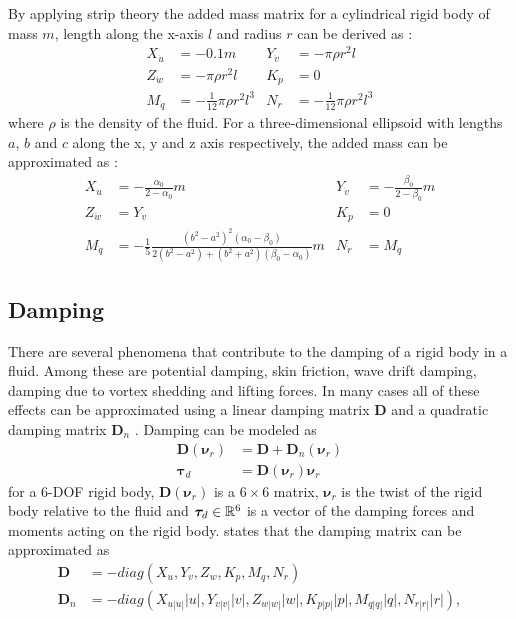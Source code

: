 By applying strip theory the added mass matrix for a cylindrical rigid body of
mass $m$, length along the x-axis $l$ and radius $r$ can be derived as \cite{fossen1994}:
\begin{align}
 X_{\dot{u}} &= -0.1 m &
 Y_{\dot{v}} &= -\pi \rho r^2 l \nonumber \\
 Z_{\dot{w}} &= -\pi \rho r^2 l &
 K_{\dot{p}} &= 0 \\
 M_{\dot{q}} &= -\frac{1}{12} \pi \rho r^2 l^3 &
 N_{\dot{r}} &= -\frac{1}{12} \pi \rho r^2 l^3 \nonumber
\end{align}
where $\rho$ is the density of the fluid. For a three-dimensional ellipsoid with
lengths $a$, $b$ and $c$ along the x, y and z axis respectively, the added mass
can be approximated as \cite{fossen2021}:
\begin{align}
 X_{\dot{u}} &= -\frac{\alpha_0}{2-\alpha_0}m &
 Y_{\dot{v}} &= -\frac{\beta_0}{2-\beta_0}m \nonumber \\
 Z_{\dot{w}} &= Y_{\dot{v}}&
 K_{\dot{p}} &= 0 \label{eq:ellipsoid_added_mass} \\
 M_{\dot{q}} &= -\frac{1}{5}\frac{(b^2-a^2)^2(\alpha_0-\beta_0)}{2(b^2-a^2) + (b^2+a^2)(\beta_0-\alpha_0)}m&
 N_{\dot{r}} &= M_{\dot{q}} \nonumber
\end{align}

\subsection{Damping}

There are several phenomena that contribute to the damping of a rigid body in
a fluid. Among these are potential damping, skin friction, wave drift damping,
damping due to vortex shedding and lifting forces. In many cases
all of these effects can be approximated using a linear damping matrix $\bm{D}$ and
a quadratic damping matrix $\bm{D}_n$ \cite{fossen2021}. Damping can be modeled
as
\begin{align}
    \bm{D}(\bm{\nu}_r) &= \bm{D} + \bm{D}_n(\bm{\nu}_r) \\
    \bm{\tau}_d &= \bm{D}(\bm{\nu}_r)\bm{\nu}_r
\end{align}
for a 6-DOF rigid body, $\bm{D}(\bm{\nu}_r)$ is a $6\times 6$ matrix, $\bm{\nu}_r$
is the twist of the rigid body relative to the fluid and $\bm{\tau}_d \in \mathbb{R}^6$
is a vector of the damping forces and moments acting on the rigid body. \cite{antonelli2018}
states that the damping matrix can be approximated as
\begin{subequations}
\begin{align}
    \bm{D} &= -diag(X_u, Y_v, Z_w, K_p, M_q, N_r) \\
    \bm{D}_n &= -diag(X_{u|u|}|u|, Y_{v|v|}|v|, Z_{w|w|}|w|, K_{p|p|}|p|, M_{q|q|}|q|, N_{r|r|}|r|),
\end{align}
\end{subequations}

